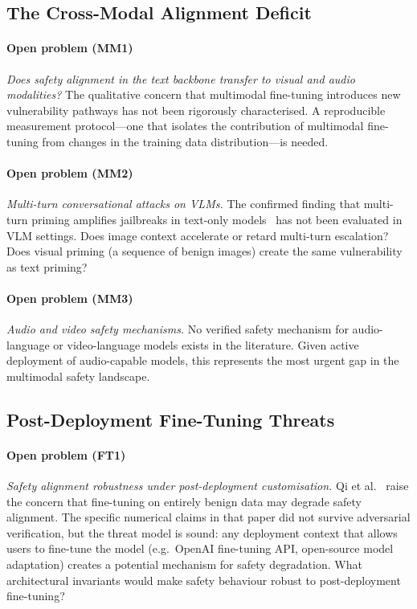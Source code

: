 \subsection{The Cross-Modal Alignment Deficit}

\paragraph{Open problem (MM1)}
\textit{Does safety alignment in the text backbone transfer to visual and audio
modalities?}
The qualitative concern that multimodal fine-tuning introduces new vulnerability
pathways has not been rigorously characterised.
A reproducible measurement protocol---one that isolates the contribution of
multimodal fine-tuning from changes in the training data distribution---is needed.

\paragraph{Open problem (MM2)}
\textit{Multi-turn conversational attacks on VLMs.}
The confirmed finding that multi-turn priming amplifies jailbreaks in text-only
models~\cite{russinovich2024greatescalation} has not been evaluated in VLM settings.
Does image context accelerate or retard multi-turn escalation?
Does visual priming (a sequence of benign images) create the same vulnerability as
text priming?

\paragraph{Open problem (MM3)}
\textit{Audio and video safety mechanisms.}
No verified safety mechanism for audio-language or video-language models exists in
the literature.
Given active deployment of audio-capable models, this represents the most urgent
gap in the multimodal safety landscape.

\subsection{Post-Deployment Fine-Tuning Threats}

\paragraph{Open problem (FT1)}
\textit{Safety alignment robustness under post-deployment customisation.}
Qi et al.~\cite{qi2023finetuning} raise the concern that fine-tuning on entirely
benign data may degrade safety alignment.
The specific numerical claims in that paper did not survive adversarial verification,
but the threat model is sound: any deployment context that allows users to fine-tune
the model (e.g.\ OpenAI fine-tuning API, open-source model adaptation) creates a
potential mechanism for safety degradation.
What architectural invariants would make safety behaviour robust to post-deployment
fine-tuning?


